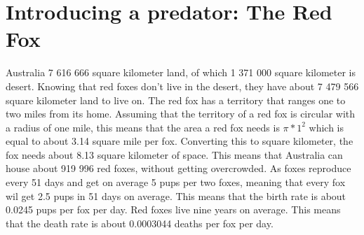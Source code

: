 \documentclass{article}
\begin{document}
\section{Introducing a predator: The Red Fox}
Australia 7 616 666 square kilometer land, of which 1 371 000 square kilometer is desert. Knowing that red foxes don't live in the desert, they have about 7 479 566 square kilometer land to live on. The red fox has a territory that ranges one to two miles from its home. Assuming that the territory of a red fox is circular with a radius of one mile, this means that the area a red fox needs is $\pi*1^2$ which is equal to about 3.14 square mile per fox.\cite{FoxTerritoryReproduction} Converting this to square kilometer, the fox needs about 8.13 square kilometer of space. This means that Australia can house about 919 996 red foxes, without getting overcrowded. As foxes reproduce every 51 days and get on average 5 pups per two foxes, meaning that every fox wil get 2.5 pups in 51 days on average.\cite{FoxTerritoryReproduction} This means that the birth rate is about 0.0245 pups per fox per day. Red foxes live nine years on average.\cite{FoxLife} This means that the death rate is about 0.0003044 deaths per fox per day.
\end{document}
